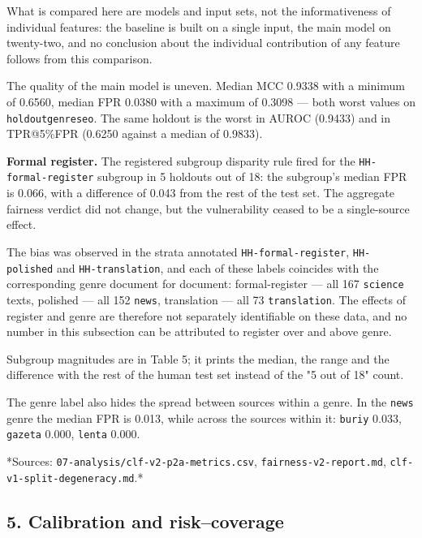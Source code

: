 \documentclass[11pt,a4paper]{article}
\renewcommand{\_}{\textunderscore\allowbreak}
\begin{document}
What is compared here are models and input sets, not the informativeness of
individual features: the baseline is built on a single input, the main model
on twenty-two, and no conclusion about the individual contribution of any
feature follows from this comparison.

The quality of the main model is uneven. Median MCC 0.9338 with a minimum of
0.6560, median FPR 0.0380 with a maximum of 0.3098 — both worst values on
\texttt{holdout\_genre\_seo}. The same holdout is the worst in AUROC (0.9433) and in
TPR@5\%FPR (0.6250 against a median of 0.9833).

\textbf{Formal register.} The registered subgroup disparity rule fired for the
\texttt{HH-\allowbreak{}formal-\allowbreak{}register} subgroup in 5 holdouts out of 18: the subgroup's median
FPR is 0.066, with a difference of 0.043 from the rest of the test set. The
aggregate fairness verdict did not change, but the vulnerability ceased to be
a single-source effect.

The bias was observed in the strata annotated \texttt{HH-\allowbreak{}formal-\allowbreak{}register},
\texttt{HH-\allowbreak{}polished} and \texttt{HH-\allowbreak{}translation}, and each of these labels coincides with
the corresponding genre document for document: formal-register — all 167
\texttt{science} texts, polished — all 152 \texttt{news}, translation — all 73
\texttt{translation}. The effects of register and genre are therefore not separately
identifiable on these data, and no number in this subsection can be attributed
to register over and above genre.

Subgroup magnitudes are in Table 5; it prints the median, the range and the
difference with the rest of the human test set instead of the "5 out of 18"
count.

\setcounter{table}{4}


The genre label also hides the spread between sources within a genre. In
the \texttt{news} genre the median FPR is 0.013, while across the sources within it:
\texttt{buriy\_2014} 0.033, \texttt{gazeta} 0.000, \texttt{lenta} 0.000.

*Sources: \texttt{07-\allowbreak{}analysis/clf-\allowbreak{}v2-\allowbreak{}p2a-\allowbreak{}metrics.csv}, \texttt{fairness-\allowbreak{}v2-\allowbreak{}report.md},
\texttt{clf-\allowbreak{}v1-\allowbreak{}split-\allowbreak{}degeneracy.md}.*

\subsection{5. Calibration and risk–coverage}
\end{document}
